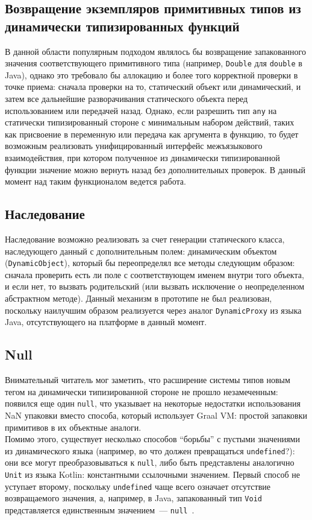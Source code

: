 \documentclass[times,specification,annotation]{itmo-student-thesis}
\begin{document}
\subsection{Возвращение экземпляров примитивных типов из динамически типизированных функций}
В данной области популярным подходом являлось бы возвращение запакованного значения соответствующего примитивного типа (например, \texttt{Double} для \texttt{double} в Java), однако это требовало бы аллокацию и более того корректной проверки в точке приема: сначала проверки на то, статический объект или динамический, и затем все дальнейшие разворачивания статического объекта перед использованием или передачей назад. Однако, если разрешить тип \texttt{any} на статически типизированный стороне с минимальным набором действий, таких как присвоение в переменную или передача как аргумента в функцию, то будет возможным реализовать унифицированный интерфейс межъязыкового взаимодействия, при котором полученное из динамически типизированной функции значение можно вернуть назад без дополнительных проверок. В данный момент над таким функционалом ведется работа.
\subsection{Наследование}
Наследование возможно реализовать за счет генерации статического класса, наследующего данный с дополнительным полем: динамическим объектом (\texttt{DynamicObject}), который бы переопределял все методы следующим образом: сначала проверить есть ли поле с соответствующем именем внутри того объекта, и если нет, то вызвать родительский (или вызвать исключение о неопределенном абстрактном методе). Данный механизм в прототипе не был реализован, поскольку наилучшим образом реализуется через аналог \texttt{DynamicProxy} из языка Java, отсутствующего на платформе в данный момент.
\subsection{Null}
Внимательный читатель мог заметить, что расширение системы типов новым тегом на динамически типизированной стороне не прошло незамеченным: появился еще один \texttt{null}, что указывает на некоторые недостатки использования NaN упаковки вместо способа, который использует Graal VM: простой запаковки примитивов в их объектные аналоги.\\
Помимо этого, существует несколько способов ``борьбы'' с пустыми значениями из динамического языка (например, во что должен превращаться \texttt{undefined}?): они все могут преобразовываться к \texttt{null}, либо быть представлены аналогично \texttt{Unit} из языка Kotlin: константными ссылочными значением. Первый способ не уступает второму, поскольку \texttt{undefined} чаще всего означает отсутствие возвращаемого значения, а, например, в Java, запакованный тип \texttt{Void} представляется единственным значением~--- \texttt{null}~\cite{java-lang-void}.
\end{document}
